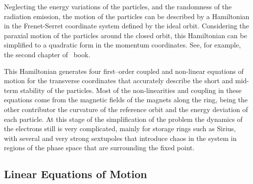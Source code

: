     Neglecting the energy variations of the particles, and the randomness of the radiation emission, the motion of the particles can be described by a Hamiltonian in the Frenet-Serret coordinate system defined by the ideal orbit. Considering the paraxial motion of the particles around the closed orbit, this Hamiltonian can be simplified to a quadratic form in the momentum coordinates. See, for example, the second chapter of~ book.

    This Hamiltonian generates four first--order coupled and non-linear equations of motion for the transverse coordinates that accurately describe the short and mid-term stability of the particles. Most of the non-linearities and coupling in these equations come from the magnetic fields of the magnets along the ring, being the other contributor the curvature of the reference orbit and the energy deviation of each particle. At this stage of the simplification of the problem the dynamics of the electrons still is very complicated, mainly for storage rings such as Sirius, with several and very strong sextupoles that introduce chaos in the system in regions of the phase space that are surrounding the fixed point.

\subsection{Linear Equations of Motion}

